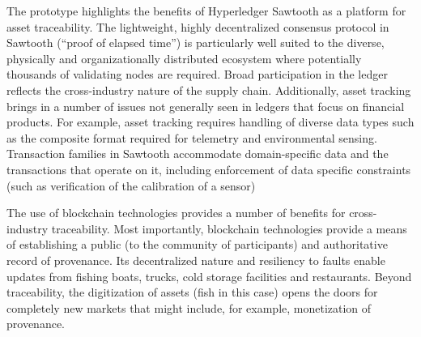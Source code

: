 The prototype highlights the benefits of Hyperledger Sawtooth as a platform for asset
traceability. The lightweight, highly decentralized consensus protocol in Sawtooth (``proof of
elapsed time'') is particularly well suited to the diverse, physically and organizationally
distributed ecosystem where potentially thousands of validating nodes are required. Broad
participation in the ledger reflects the cross-industry nature of the supply chain. Additionally,
asset tracking brings in a number of issues not generally seen in ledgers that focus on financial
products. For example, asset tracking requires handling of diverse data types such as the composite
format required for telemetry and environmental sensing. Transaction families in Sawtooth
accommodate domain-specific data and the transactions that operate on it, including enforcement of
data specific constraints (such as verification of the calibration of a sensor)

The use of blockchain technologies provides a number of benefits for cross-industry
traceability. Most importantly, blockchain technologies provide a means of establishing a public (to
the community of participants) and authoritative record of provenance. Its decentralized nature and
resiliency to faults enable updates from fishing boats, trucks, cold storage facilities and
restaurants. Beyond traceability, the digitization of assets (fish in this case) opens the doors for
completely new markets that might include, for example, monetization of provenance.
